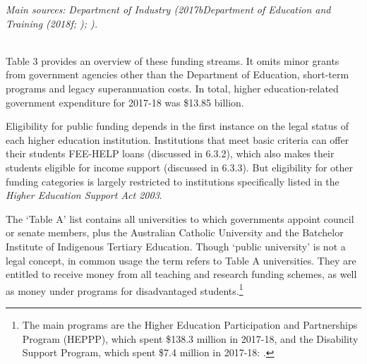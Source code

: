 \documentclass{grattan}
\begin{document}
\begin{table}

\end{table}

\emph{Main sources:} \emph{Department of Industry (2017bDepartment of Education and Training (2018f\textcite[][]{DepartmentofSocialServices2018porfoliobudgetsta}; ); ).}

\emph{\\
}Table 3 provides an overview of these funding streams. It omits minor grants from government agencies other than the Department of Education, short-term programs and legacy superannuation costs. In total, higher education-related government expenditure for 2017-18 was \$13.85 billion.

Eligibility for public funding depends in the first instance on the legal status of each higher education institution. Institutions that meet basic criteria can offer their students FEE-HELP loans (discussed in 6.3.2), which also makes their students eligible for income support (discussed in 6.3.3). But eligibility for other funding categories is largely restricted to institutions specifically listed in the \emph{Higher Education Support Act 2003}.

The `Table A' list contains all universities to which governments appoint council or senate members, plus the Australian Catholic University and the Batchelor Institute of Indigenous Tertiary Education. Though `public university' is not a legal concept, in common usage the term refers to Table A universities. They are entitled to receive money from all teaching and research funding schemes, as well as money under programs for disadvantaged students.\footnote{The main programs are the Higher Education Participation and Partnerships Program (HEPPP), which spent \$138.3 million in 2017-18, and the Disability Support Program, which spent \$7.4 million in 2017-18: \textcite[][48]{DepartmentofEducationandTraining2018portfoliobudgetst}.}
\end{document}
